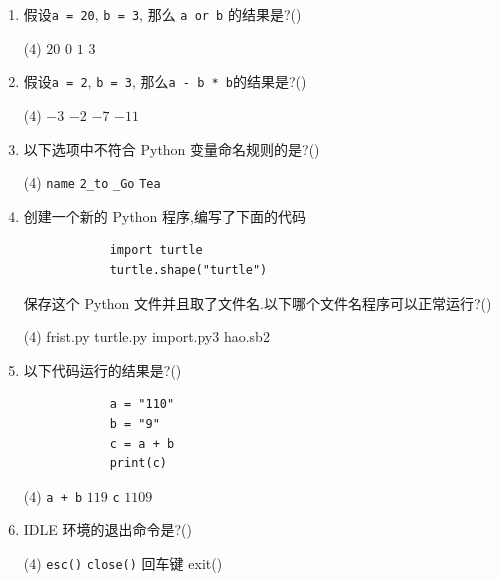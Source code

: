 \documentclass[11pt]{ctexart}
\begin{document}
\begin{enumerate}
        \item 假设\lstinline{a = 20}, \lstinline{b = 3}, 那么 \lstinline{a or b} 的结果是?(\qquad)
        \begin{tasks}(4)
            \task $20$
            \task $0$
            \task $1$
            \task $3$
        \end{tasks}

        \newpage
        \item 假设\lstinline{a = 2}, \lstinline{b = 3}, 那么\lstinline{a - b * b}的结果是?(\qquad)
        \begin{tasks}(4)
            \task $-3$
            \task $-2$
            \task $-7$
            \task $-11$
        \end{tasks}

        \item 以下选项中不符合 Python 变量命名规则的是?(\qquad)
        \begin{tasks}(4)
            \task \lstinline{name}
            \task \lstinline{2_to}
            \task \lstinline{_Go}
            \task \lstinline{Tea}
        \end{tasks}

        \item 创建一个新的 Python 程序,编写了下面的代码
        \begin{lstlisting}
            import turtle
            turtle.shape("turtle")
        \end{lstlisting}
        保存这个 Python 文件并且取了文件名.以下哪个文件名程序可以正常运行?(\qquad)
        \begin{tasks}(4)
            \task frist.py
            \task turtle.py
            \task import.py3
            \task hao.sb2
        \end{tasks}

        \item 以下代码运行的结果是?(\qquad)
        \begin{lstlisting}
            a = "110"
            b = "9"
            c = a + b
            print(c)
        \end{lstlisting}
        \begin{tasks}(4)
            \task \lstinline{a + b}
            \task $119$
            \task \lstinline{c}
            \task $1109$
        \end{tasks}

        \item IDLE 环境的退出命令是?(\qquad)
        \begin{tasks}(4)
            \task \lstinline{esc()}
            \task \lstinline{close()}
            \task 回车键
            \task exit()
        \end{tasks}


\end{enumerate}
\end{document}
